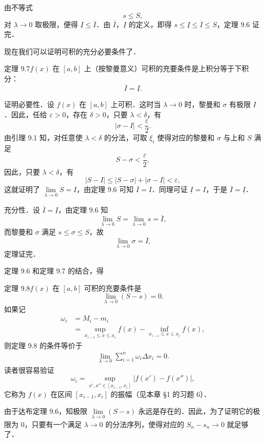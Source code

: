 由不等式
\[
s \leqslant S,
\]
对 $\lambda \to 0$ 取极限，便得 $\underline{I} \leqslant \overline{I}$．由 $\overline{I}$，$\underline{I}$ 的定义，即得 $s \leqslant \underline{I} \leqslant \overline{I} \leqslant S$，定理 9.6 证完．

现在我们可以证明可积的充分必要条件了．

{\thmheadfont 定理 9.7}\quad $f(x)$ 在 $[a, b]$ 上（按黎曼意义）可积的充要条件是上积分等于下积分：
\[
\overline{I} = \underline{I}.
\]

{\thmheadfont 证明}\quad 必要性．设 $f(x)$ 在 $[a, b]$ 上可积．这时当 $\lambda \to 0$ 时，黎曼和 $\sigma$ 有极限 $I$．因此，任给 $\varepsilon > 0$，存在 $\delta > 0$，只要 $\lambda < \delta$，有
\[
\left| \sigma - I \right| < \frac{\varepsilon}{2}.
\]
由引理 9.1 知，对任意使 $\lambda < \delta$ 的分法，可取 $\xi_i$ 使得对应的黎曼和 $\sigma$ 与上和 $S$ 满足
\[
S - \sigma < \frac{\varepsilon}{2},
\]
因此，只要 $\lambda < \delta$，有
\[
\left| S - I \right| \leqslant \left| S - \sigma \right| + \left| \sigma - I \right| < \varepsilon,
\]
这就证明了 $\lim\limits_{\lambda \to 0} S = I$，由定理 9.6 可知 $\overline{I} = I$．同理可证 $\underline{I} = I$，于是 $\overline{I} = \underline{I}$．

充分性．设 $\overline{I} = \underline{I}$，由定理 9.6 知
\[
\lim_{\lambda \to 0} S = \lim_{\lambda \to 0} s = \overline{I},
\]
而黎曼和 $\sigma$ 满足 $s \leqslant \sigma \leqslant S$，故
\[
\lim_{\lambda \to 0} \sigma = \overline{I},
\]
定理证完．

定理 9.6 和定理 9.7 的结合，得

{\thmheadfont 定理 9.8}\quad $f(x)$ 在 $[a, b]$ 可积的充要条件是
\[
\lim_{\lambda \to 0} \left( S - s \right) = 0.
\]
如果记
\[
\begin{aligned}
\omega_i &= M_i - m_i \\
&= \sup_{x_{i-1} \leqslant x \leqslant x_i} f(x) - \inf_{x_{i-1} \leqslant x \leqslant x_i} f(x),
\end{aligned}
\]
则定理 9.8 的条件等价于
\begin{align}
\lim_{\lambda \to 0} \sum_{i=1}^{n} \omega_i \Delta x_i = 0. \tag{1}
\end{align}
读者很容易验证
\[
\omega_i = \sup_{x', x'' \in [x_{i-1}, x_i]} \left| f(x') - f(x'') \right|,
\]
它称为 $f(x)$ 在区间 $[x_{i-1}, x_i]$ 的振幅（见本章 §1 的习题 6）．

由于达布定理 9.6，知极限 $\lim\limits_{\lambda \to 0} (S - s)$ 永远是存在的．因此，为了证明它的极限为 $0$，只要有一个满足 $\lambda \to 0$ 的分法序列，使得对应的 $S_n - s_n \to 0$ 就足够了．

